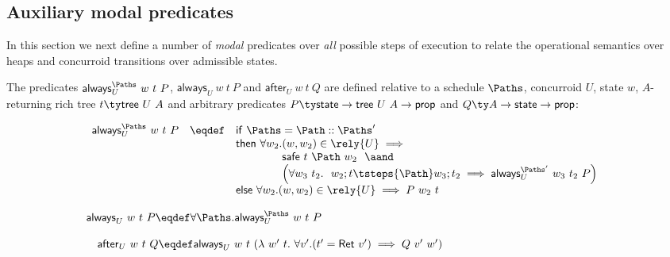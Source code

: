 \subsection{Auxiliary modal predicates}
\label{sec:modal-pred}

In this section we next define a number of \emph{modal} predicates
over \emph{all} possible steps of execution to relate the operational
semantics over heaps and concurroid transitions over admissible
states.

\begin{definition}
  \label{def:modpred} 
%
  The predicates $\mathsf{always}^{\Paths}_U~w~t~P$,
  $\mathsf{always}_U~w~t~P$ and $\mathsf{after}_U~w~t~Q$ are defined
  relative to a schedule $\Paths$, concurroid $U$, state $w$,
  $A$-returning rich tree $t \ty \mathsf{tree}~U~A$ and arbitrary
  predicates $P \ty \mathsf{state} \to \mathsf{tree}~U~A \to
  \mathsf{prop}$ and $Q \ty A \to \mathsf{state} \to \mathsf{prop}$:

\[
\begin{array}{l}
\begin{array}{rcl}
\mathsf{always}^{\Paths}_U~w~t~P & \eqdef & 
\mathsf{if}~\Paths = \Path :: \Paths' 
\\ 
&& \mathsf{then}~\forall w_2. (w, w_2) \in \rely{U} \implies 
\\
&& ~~~~
   ~~~~~~~
   \begin{array}{l}\mathsf{safe}~t~\Path~w_2 ~~\aand \\
   \left(\forall w_3~t_2.~~ w_2; t \tsteps{\Path} w_3; t_2 \implies
   \mathsf{always}^{\Paths'}_U~w_3~t_2~P \right)
   \end{array}
\\
&& \mathsf{else}~ \forall w_2. (w, w_2) \in \rely{U} \implies P~w_2~t
\end{array}
\\
\\
\mathsf{always}_U~w~t~P  \eqdef \forall \Paths.
\mathsf{always}^{\Paths}_U~w~t~P
\\
\\
~~~\mathsf{after}_U~w~t~Q \eqdef \mathsf{always}_U~w~t~(\lambda~w'~t.~\forall v'. (t' = \mathsf{Ret}~v') \implies Q~v'~w') 
\end{array}
\]

\end{definition}

